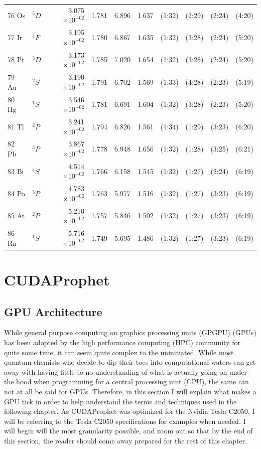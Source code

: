 \documentclass[12pt]{report}
\begin{document}
\begin{longtable}{l l r r r r r r r r}
76 Os & $^{5}D$ & 3.075$\times10^{-02}$ & 1.781 & 6.896 & 1.637 & (1:32) & (2:29) & (2:24) & (4:20) \\
77 Ir & $^{4}F$ & 3.195$\times10^{-02}$ & 1.780 & 6.867 & 1.635 & (1:32) & (3:28) & (2:24) & (5:20) \\
78 Pt & $^{3}D$ & 3.173$\times10^{-02}$ & 1.785 & 7.020 & 1.654 & (1:32) & (3:28) & (2:24) & (5:20) \\
79 Au & $^{2}S$ & 3.190$\times10^{-02}$ & 1.791 & 6.702 & 1.569 & (1:33) & (4:28) & (2:23) & (5:19) \\
80 Hg & $^{1}S$ & 3.546$\times10^{-02}$ & 1.781 & 6.691 & 1.604 & (1:32) & (3:28) & (2:23) & (5:20) \\
81 Tl & $^{2}P$ & 3.241$\times10^{-02}$ & 1.794 & 6.826 & 1.561 & (1:34) & (1:29) & (3:23) & (6:20) \\
82 Pb & $^{3}P$ & 3.867$\times10^{-02}$ & 1.778 & 6.948 & 1.656 & (1:32) & (1:28) & (3:25) & (6:21) \\
83 Bi & $^{4}S$ & 4.514$\times10^{-02}$ & 1.766 & 6.158 & 1.545 & (1:32) & (1:27) & (2:24) & (6:19) \\
84 Po & $^{3}P$ & 4.783$\times10^{-02}$ & 1.763 & 5.977 & 1.516 & (1:32) & (1:27) & (3:23) & (6:19) \\
85 At & $^{2}P$ & 5.210$\times10^{-02}$ & 1.757 & 5.846 & 1.502 & (1:32) & (1:27) & (3:23) & (6:19) \\
86 Rn & $^{1}S$ & 5.716$\times10^{-02}$ & 1.749 & 5.695 & 1.486 & (1:32) & (1:27) & (3:23) & (6:19) \\
\bottomrule
\end{longtable}


\chapter{CUDAProphet}
\section{GPU Architecture}
While general purpose computing on graphics processing units (GPGPU) (GPUs) has been adopted by the high performance computing (HPC) community for quite some time, it can seem quite complex to the uninitiated. While most quantum chemists who decide to dip their toes into computational waters can get away with having little to no understanding of what is actually going on under the hood when programming for a central processing uint (CPU), the same can not at all be said for GPUs. Therefore, in this section I will explain what makes a GPU tick in order to help understand the terms and techniques used in the following chapter. As CUDAProphet was optimized for the Nvidia Tesla C2050, I will be referring to the Tesla C2050 specifications for examples when needed. I will begin will the most granularity possible, and zoom out so that by the end of this section, the reader should come away prepared for the rest of this chapter.
\end{document}

